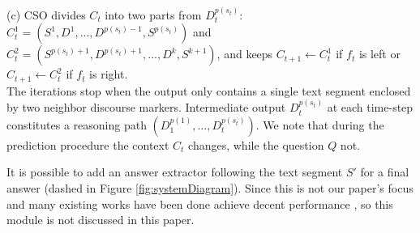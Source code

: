 (c) CSO divides $C_t$ into two parts from $D^{p(s_t)}_t$: $C^1_t=(S^1, D^1,...,D^{p(s_t)-1}, S^{p(s_t)})$ and $C^2_t=(S^{p(s_t)+1}, D^{p(s_t)+1},...,D^k, S^{k+1})$, and keeps $C_{t+1} \leftarrow C_{t}^{1}$ if $f_t$ is left or $C_{t+1} \leftarrow C_{t}^{2}$ if $f_t$ is right. \\
The iterations stop when the output only contains a single text segment enclosed by two neighbor discourse markers. Intermediate output $D^{p(s_t)}_t$ at each time-step constitutes a reasoning path $(D^{p(1)}_1,...,D^{p(s_t)}_t)$. We note that during the prediction procedure the context $C_t$ changes, while the question $Q$ not. 

It is possible to add an answer extractor following the text segment $S'$ for a final answer (dashed in Figure \ref{fig:systemDiagram}). Since this is not our paper's focus and many existing works have been done achieve decent performance \cite{DBLP:conf/ijcai/HuPHQW018}, so this module is not discussed in this paper. %





